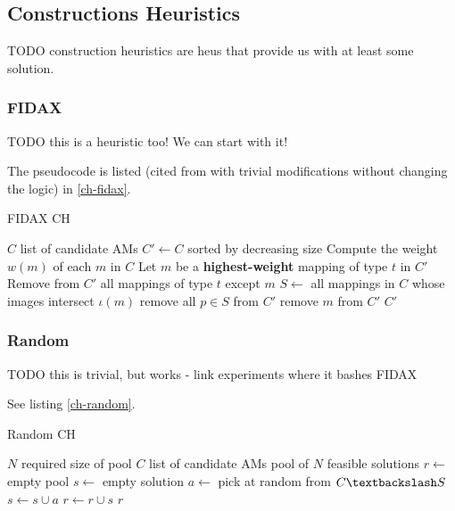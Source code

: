 \documentclass[a4paper,12pt,oneside]{report}
\begin{document}
\subsection{Constructions Heuristics}

TODO construction heuristics are heus that provide us with at least some solution.

\subsubsection{FIDAX}

TODO this is a heuristic too! We can start with it!

The pseudocode is listed (cited from \cite{fidax} with trivial modifications without changing the logic) in \ref{ch-fidax}.

\begin{algorithm}
\caption{FIDAX CH}
\label{ch-fidax}
\begin{algorithmic}
\REQUIRE $C$ list of candidate AMs
\STATE $C' \gets C$ sorted by decreasing size
\STATE Compute the weight $w(m)$ of each $m$ in $C$
  \STATE Let $m$ be a \textbf{highest-weight} mapping of type $t$ in $C'$
  \STATE Remove from $C'$ all mappings of type $t$ except $m$
\ENDFOR
{}
  \STATE $S \gets$ all mappings in $C$ whose images intersect $\iota(m)$
    \STATE remove all $p \in S$ from $C'$
  \ELSE
  	\STATE remove $m$ from $C'$
  \ENDIF
\ENDFOR
\RETURN $C'$
\end{algorithmic}
\end{algorithm}

\subsubsection{Random}

TODO this is trivial, but works - link experiments where it bashes FIDAX

See listing \ref{ch-random}.

\begin{algorithm}
\caption{Random CH}
\label{ch-random}
\begin{algorithmic}
\REQUIRE $N$ required size of pool
\REQUIRE $C$ list of candidate AMs
\ENSURE pool of $N$ feasible solutions
\STATE $r \gets $ empty pool
\STATE {}
\STATE $s \gets $ empty solution
\STATE $a \gets $ pick at random from $C \textbackslash S$
\STATE $s \gets s \cup a$
\ENDWHILE
\STATE $r \gets r \cup s$
\ENDFOR
\RETURN $r$
\end{algorithmic}
\end{algorithm}
\end{document}
